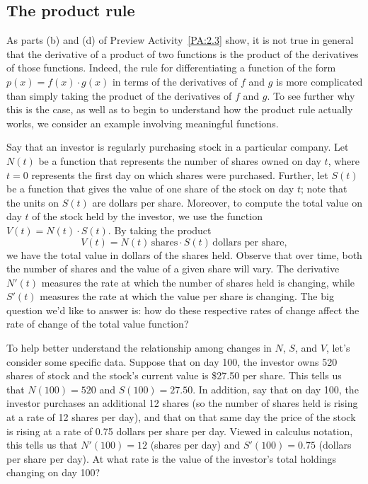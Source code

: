 

\subsection*{The product rule}

As parts (b) and (d) of Preview Activity~\ref{PA:2.3} show, it is not true in general that the derivative of a product of two functions is the product of the derivatives of those functions.  Indeed, the rule for differentiating a function of the form $p(x) = f(x) \cdot g(x)$ in terms of the derivatives of $f$ and $g$ is more complicated than simply taking the product of the derivatives of $f$ and $g$.  To see further why this is the case, as well as to begin to understand how the product rule actually works, we consider an example involving meaningful functions.

Say that an investor is regularly purchasing stock in a particular company.  Let $N(t)$ be a function that represents the number of shares owned on day $t$, where $t = 0$ represents the first day on which shares were purchased.  Further, let $S(t)$ be a function that gives the value of one share of the stock on day $t$; note that the units on $S(t)$ are dollars per share.  Moreover, to compute the total value on day $t$ of the stock held by the investor, we use the function $V(t) = N(t) \cdot S(t)$.  By taking the product 
$$V(t) = N(t) \, \mbox{shares} \cdot S(t) \, \mbox{dollars per share},$$ 
we have the total value in dollars of the shares held.  Observe that over time, both the number of shares and the value of a given share will vary.  The derivative $N'(t)$ measures the rate at which the number of shares held is changing, while $S'(t)$ measures the rate at which the value per share is changing.  The big question we'd like to answer is: how do these respective rates of change affect the rate of change of the total value function?

To help better understand the relationship among changes in $N$, $S$, and $V$, let's consider some specific data.  Suppose that on day 100, the investor owns 520 shares of stock and the stock's current value is \$27.50 per share.  This tells us that $N(100) = 520$ and $S(100) = 27.50$.  In addition, say that on day 100, the investor purchases an additional 12 shares (so the number of shares held is rising at a rate of 12 shares per day), and that on that same day the price of the stock is rising at a rate of 0.75 dollars per share per day.  Viewed in calculus notation, this tells us that $N'(100) = 12$ (shares per day) and $S'(100) = 0.75$ (dollars per share per day).  At what rate is the value of the investor's total holdings changing on day 100?

